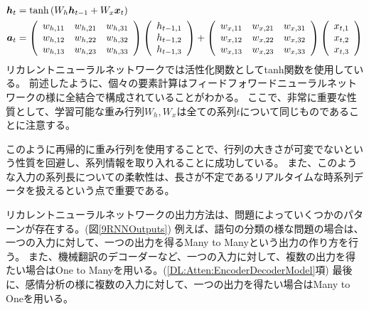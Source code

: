 \begin{equation}
 \begin{split}
  {\mbox{\boldmath{$h$}}}_t 
  &= \tanh{(W_h{\mbox{\boldmath{$h$}}}_{t-1}+W_x{\mbox{\boldmath{$x$}}}_t)}\\
  {\mbox{\boldmath{$a$}}}_t 
  &=
  \left(
    \begin{array}{ccc}
      w_{h,11} & w_{h,21} & w_{h,31} \\
      w_{h,12} & w_{h,22} & w_{h,32} \\
      w_{h,13} & w_{h,23} & w_{h,33}
    \end{array}
  \right)
  \left(
    \begin{array}{ccc}
      h_{t-1,1} \\
      h_{t-1,2} \\
      h_{t-1,3}
    \end{array}
  \right)
  +
  \left(
    \begin{array}{ccc}
      w_{x,11} & w_{x,21} & w_{x,31} \\
      w_{x,12} & w_{x,22} & w_{x,32} \\
      w_{x,13} & w_{x,23} & w_{x,33}
    \end{array}
  \right)
  \left(
    \begin{array}{ccc}
      x_{t,1} \\
      x_{t,2} \\
      x_{t,3}
    \end{array}
  \right)
 \end{split}
\end{equation}
リカレントニューラルネットワークでは活性化関数としてtanh関数を使用している。
前述したように、個々の要素計算はフィードフォワードニューラルネットワークの様に全結合で構成されていることがわかる。
ここで、非常に重要な性質として、学習可能な重み行列$W_{h}, W_{x}$は全ての系列$t$について同じものであることに注意する。

このように再帰的に重み行列を使用することで、行列の大きさが可変でないという性質を回避し、系列情報を取り入れることに成功している。
また、このような入力の系列長についての柔軟性は、長さが不定であるリアルタイムな時系列データを扱えるという点で重要である。

リカレントニューラルネットワークの出力方法は、問題によっていくつかのパターンが存在する。(図\ref{9RNNOutputs})
例えば、語句の分類の様な問題の場合は、一つの入力に対して、一つの出力を得るMany to Manyという出力の作り方を行う。
また、機械翻訳のデコーダーなど、一つの入力に対して、複数の出力を得たい場合はOne to Manyを用いる。(\ref{DL:Atten:EncoderDecoderModel}項)
最後に、感情分析の様に複数の入力に対して、一つの出力を得たい場合はMany to Oneを用いる。

